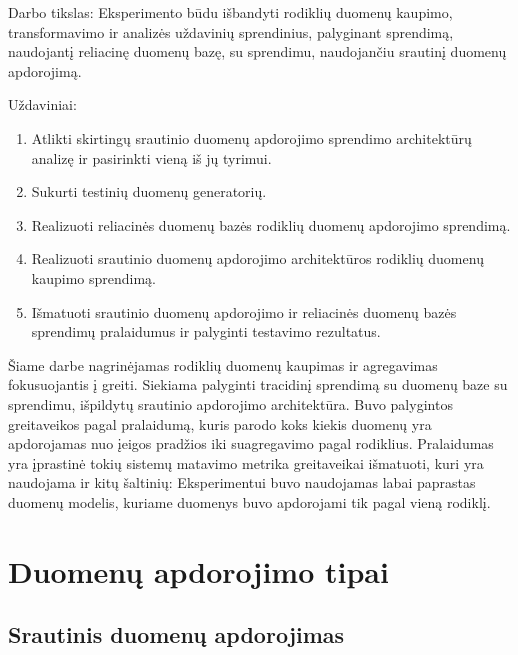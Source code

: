 \documentclass{VUMIFPSkursinis}
\begin{document}
Darbo tikslas: Eksperimento būdu išbandyti rodiklių duomenų kaupimo, transformavimo ir analizės uždavinių sprendinius, 
palyginant sprendimą, naudojantį reliacinę duomenų bazę, su sprendimu, naudojančiu srautinį duomenų apdorojimą. \par
\newpage
Uždaviniai:
\begin{enumerate}
    \item Atlikti skirtingų srautinio duomenų apdorojimo sprendimo architektūrų analizę ir pasirinkti vieną iš jų tyrimui.
    \item Sukurti testinių duomenų generatorių.
    \item Realizuoti reliacinės duomenų bazės rodiklių duomenų apdorojimo sprendimą.
    \item Realizuoti srautinio duomenų apdorojimo architektūros rodiklių duomenų kaupimo sprendimą.
    \item Išmatuoti srautinio duomenų apdorojimo ir reliacinės duomenų bazės sprendimų pralaidumus ir palyginti testavimo rezultatus.
\end{enumerate}
Šiame darbe nagrinėjamas rodiklių duomenų kaupimas ir agregavimas fokusuojantis į greiti. Siekiama palyginti tracidinį sprendimą su duomenų baze su sprendimu,
išpildytų srautinio apdorojimo architektūra. Buvo palygintos greitaveikos pagal pralaidumą, kuris parodo koks kiekis duomenų yra apdorojamas nuo įeigos pradžios iki
suagregavimo pagal rodiklius. Pralaidumas yra įprastinė tokių sistemų matavimo metrika greitaveikai išmatuoti, kuri yra naudojama ir kitų šaltinių: 
\cite{karimov2018benchmarking, Lopez2016APC, chintapalli2016benchmarking} 
Eksperimentui buvo naudojamas labai paprastas duomenų modelis, kuriame duomenys buvo apdorojami tik pagal vieną rodiklį.

\section{Duomenų apdorojimo tipai}

\subsection{Srautinis duomenų apdorojimas} \label{strprocess}
\end{document}
